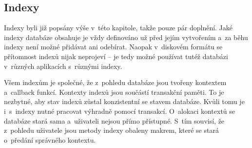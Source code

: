 \subsection{Indexy}
Indexy byli již popsány výše v~této kapitole, takže pouze pár doplnění.
Jaké indexy databáze obsahuje je vždy definováno už před jejím vytvořením
a~za běhu indexy není možné přidávat ani odebírat. Naopak v~diskovém
formátu se přítomnost indexů nijak neprojeví -- je tedy možné používat
tutéž databázi v~různých aplikacích s~různými indexy.

Všem indexům je společné,
že z~pohledu databáze jsou tvořeny kontextem a~callback funkcí. Kontexty
indexů jsou součástí transakční paměti. 
To je nezbytné, aby stav indexů zůstal konzistentní se stavem databáze.
Kvůli tomu je i~s~indexy nutné pracovat výhradně pomocí transakcí.
O~alokaci kontextů se databáze stará sama a~uživateli nejsou přímo přístupné.
S~tím souvisí, že z~pohledu uživatele jsou metody indexy obaleny makrem,
které se stará o~předání správného kontextu.

